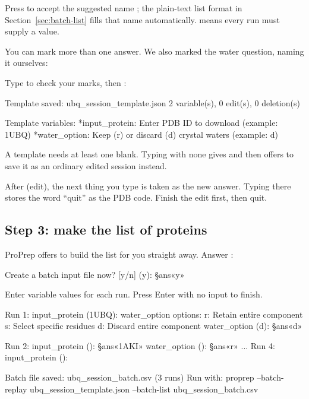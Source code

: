 Press  to accept the suggested name ; the
plain-text list format in Section~\ref{sec:batch-list} fills that name
automatically.  means every run must supply a value.

You can mark more than one answer. We also marked the water question, naming
it ourselves:


Type  to check your marks, then :

\begin{screen}
Template saved: ubq_session_template.json
2 variable(s), 0 edit(s), 0 deletion(s)

Template variables:
  *input_protein: Enter PDB ID to download (example: 1UBQ)
  *water_option: Keep (r) or discard (d) crystal waters (example: d)
\end{screen}

\begin{watchout}
A template needs at least one blank. Typing  with none gives
 and then
offers to save it as an ordinary edited session instead.
\end{watchout}

\begin{watchout}
After  (edit), the next thing you type is taken as the new answer.
Typing  there stores the word ``quit'' as the PDB code. Finish the
edit first, then quit.
\end{watchout}

\subsection{Step 3: make the list of proteins}

ProPrep offers to build the list for you straight away. Answer :

\begin{screen}
Create a batch input file now? [y/n] (y): §ans«y»

Enter variable values for each run. Press Enter with no input to finish.

Run 1:
  input_protein (1UBQ):
  water_option options:
    r: Retain entire component
    s: Select specific residues
    d: Discard entire component
  water_option (d): §ans«d»

Run 2:
  input_protein (): §ans«1AKI»
  water_option (): §ans«r»
...
Run 4:
  input_protein ():

Batch file saved: ubq_session_batch.csv (3 runs)
Run with: proprep --batch-replay ubq_session_template.json --batch-list
ubq_session_batch.csv
\end{screen}

